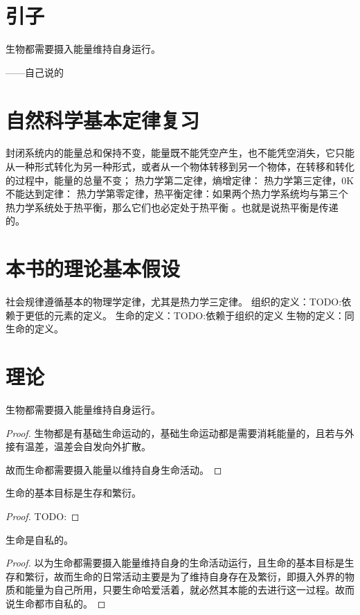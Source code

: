 \section{引子}
生物都需要摄入能量维持自身运行。

\hfill ------自己说的 

\section{自然科学基本定律复习}
封闭系统内的能量总和保持不变，能量既不能凭空产生，也不能凭空消失，它只能从一种形式转化为另一种形式，或者从一个物体转移到另一个物体，在转移和转化的过程中，能量的总量不变；
\theorem 热力学第二定律，熵增定律：
\theorem 热力学第三定律，0K不能达到定律：
\theorem 热力学第零定律，热平衡定律：如果两个热力学系统均与第三个热力学系统处于热平衡，那么它们也必定处于热平衡 。也就是说热平衡是传递的。


\section{本书的理论基本假设}
\assume  社会规律遵循基本的物理学定律，尤其是热力学三定律。
\assume 组织的定义：TODO:依赖于更低的元素的定义。
\assume 生命的定义：TODO:依赖于组织的定义
\assume 生物的定义：同生命的定义。


\section{理论}
\theorem 生物都需要摄入能量维持自身运行。
\begin{proof}
    生物都是有基础生命运动的，基础生命运动都是需要消耗能量的，且若与外接有温差，温差会自发向外扩散。

    故而生命都需要摄入能量以维持自身生命活动。
\end{proof}

\begin{theorem}
    生命的基本目标是生存和繁衍。
\end{theorem}
\begin{proof}
    TODO:
\end{proof}

\begin{theorem}
    生命是自私的。
\end{theorem}
\begin{proof}
    以为生命都需要摄入能量维持自身的生命活动运行，且生命的基本目标是生存和繁衍，故而生命的日常活动主要是为了维持自身存在及繁衍，即摄入外界的物质和能量为自己所用，只要生命哈爱活着，就必然其本能的去进行这一过程。故而说生命都市自私的。
\end{proof}

